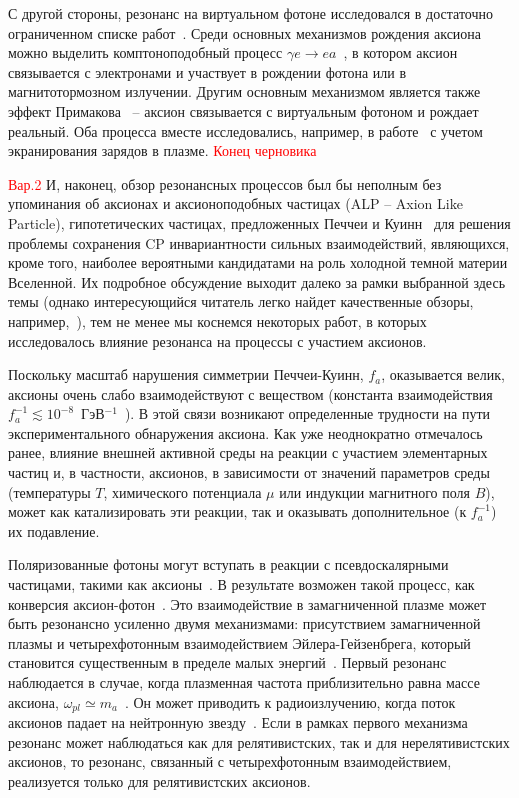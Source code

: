 С другой стороны, резонанс на виртуальном фотоне исследовался в достаточно ограниченном списке работ~\cite{Skobelev:2000,Skobelev:2007,MikhRumShk:09}. Среди основных механизмов рождения аксиона можно выделить комптоноподобный процесс $\gamma e \to e a$~\cite{Skobelev:2000}, в котором аксион связывается с электронами и участвует в рождении фотона или в магнитотормозном излучении. Другим основным механизмом является также эффект Примакова~\cite{Primakoff:1951} -- аксион связывается с виртуальным фотоном и рождает реальный. Оба процесса вместе исследовались, например, в работе~\cite{Raffelt:1996} с учетом экранирования зарядов в плазме.
\textcolor{red}{Конец черновика}

\textcolor{red}{Вар.2} И, наконец, обзор резонансных процессов был бы неполным без упоминания об аксионах и аксионоподобных частицах (ALP -- Axion Like Particle), гипотетических частицах, предложенных Печчеи и Куинн~\cite{Quinn:1977} для решения проблемы сохранения CP инвариантности сильных взаимодействий, являющихся, кроме того, наиболее вероятными кандидатами на роль холодной темной материи Вселенной. Их подробное обсуждение выходит далеко за рамки выбранной здесь темы (однако интересующийся читатель легко найдет качественные обзоры, например,~\cite{Kim:2010, Marsh:2016}), тем не менее мы коснемся некоторых работ, в которых исследовалось влияние резонанса на процессы с участием аксионов.

Поскольку масштаб нарушения симметрии Печчеи-Куинн, $f_a$, оказывается велик, аксионы очень слабо взаимодействуют с веществом (константа взаимодействия $f_a^{-1} \lesssim 10^{-8}$\, ГэВ$^{-1}$~\cite{Raffelt:1996}). В этой связи возникают определенные трудности на пути экспериментального обнаружения аксиона. Как уже неоднократно отмечалось ранее, влияние внешней активной среды на реакции с участием элементарных частиц и, в частности,  аксионов, в зависимости от значений параметров среды (температуры  $T$, химического потенциала  $\mu$ или индукции магнитного поля  $B$), может как катализировать эти реакции, так и оказывать дополнительное (к $f_a^{-1}$) их подавление.

Поляризованные фотоны могут вступать в реакции с псевдоскалярными частицами, такими как аксионы~\cite{Sikivie:1983}. В результате возможен такой процесс, как конверсия аксион-фотон~\cite{Raffelt:1988}. Это взаимодействие в замагниченной плазме может быть резонансно усиленно двумя механизмами: присутствием замагниченной плазмы и четырехфотонным взаимодействием Эйлера-Гейзенбрега, который становится существенным в пределе малых энергий~\cite{Lai:2006}. Первый резонанс наблюдается в случае, когда плазменная частота приблизительно равна массе аксиона, $\omega_{pl}\simeq m_a$~\cite{Yanagida:1988}. Он может приводить к радиоизлучению, когда поток аксионов падает на нейтронную звезду~\cite{Pshirkov:2009}. Если в рамках первого механизма резонанс может наблюдаться как для релятивистских, так и для нерелятивистских аксионов, то резонанс, связанный с четырехфотонным взаимодействием, реализуется только для релятивистских аксионов.

